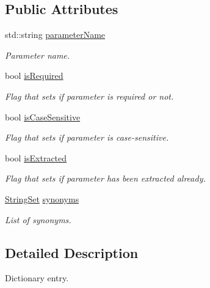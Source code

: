\subsection*{Public Attributes}
\begin{DoxyCompactItemize}
\item 
std\+::string \hyperlink{structtudat_1_1input__output_1_1dictionary_1_1DictionaryEntry_a81719f201bc0dc391e5ef36ce4e950ea}{parameter\+Name}
\begin{DoxyCompactList}\small\item\em Parameter name. \end{DoxyCompactList}\item 
bool \hyperlink{structtudat_1_1input__output_1_1dictionary_1_1DictionaryEntry_a3c4df6676ee88eac7eb79cf61f75d9f7}{is\+Required}
\begin{DoxyCompactList}\small\item\em Flag that sets if parameter is required or not. \end{DoxyCompactList}\item 
bool \hyperlink{structtudat_1_1input__output_1_1dictionary_1_1DictionaryEntry_a3c8b68c9840e1ea643325fb8f06c5c04}{is\+Case\+Sensitive}
\begin{DoxyCompactList}\small\item\em Flag that sets if parameter is case-\/sensitive. \end{DoxyCompactList}\item 
bool \hyperlink{structtudat_1_1input__output_1_1dictionary_1_1DictionaryEntry_a347ec4c8fe97ae87358fd671688a4944}{is\+Extracted}
\begin{DoxyCompactList}\small\item\em Flag that sets if parameter has been extracted already. \end{DoxyCompactList}\item 
\hyperlink{structtudat_1_1input__output_1_1dictionary_1_1DictionaryEntry_abfd99206f775c73ff0e772894839f97f}{String\+Set} \hyperlink{structtudat_1_1input__output_1_1dictionary_1_1DictionaryEntry_aabc54d115c5728ad6c88fbf95e973430}{synonyms}
\begin{DoxyCompactList}\small\item\em List of synonyms. \end{DoxyCompactList}\end{DoxyCompactItemize}


\subsection{Detailed Description}
Dictionary entry. 

